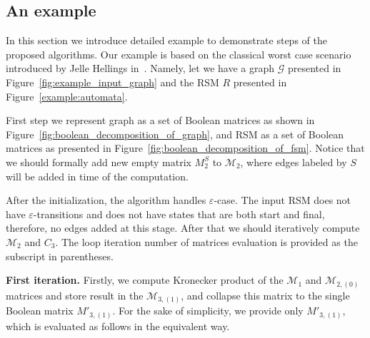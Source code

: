 \subsection{An example}
\label{example:section}
In this section we introduce detailed example to demonstrate steps of the 
proposed algorithms. Our example is based on the classical worst case scenario 
introduced by Jelle Hellings in~\cite{hellingsPathQuerying}. Namely, let we have 
a graph $\mathcal{G}$ presented in Figure~\ref{fig:example_input_graph} and the 
RSM $R$ presented in Figure~\ref{example:automata}.

First step we represent graph as a set of Boolean matrices as shown in 
Figure~\ref{fig:boolean_decomposition_of_graph}, and RSM as a set of Boolean 
matrices as presented in Figure~\ref{fig:boolean_decomposition_of_fsm}.
Notice that we should formally add new empty matrix $M_2^{S}$ to $\mathcal{M}_2$, 
where edges labeled by $S$ will be added in time of the computation. 

After the initialization, the algorithm handles $\varepsilon$-case.
The input RSM does not have $\varepsilon$-transitions and does not have states
that are both start and final, therefore, no edges added at this stage. 
After that we should iteratively compute $\mathcal{M}_2$ and $C_3$.
The loop iteration number of matrices evaluation is provided as 
the subscript in parentheses.

\textbf{First iteration.} Firstly, we compute Kronecker product of the
$\mathcal{M}_1$ and $\mathcal{M}_{2,(0)}$ matrices and store result in the
$\mathcal{M}_{3,(1)}$, and collapse this matrix to the single Boolean matrix
$M'_{3,(1)}$. For the sake of simplicity, we provide only
$M'_{3,(1)}$, which is evaluated as follows in the equivalent way.

